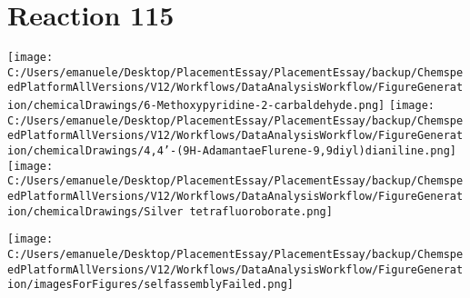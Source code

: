\documentclass{article}%
\begin{document}
\section*{Reaction 115}%
%
\begin{scheme}[H]%
\begin{minipage}{0.5\textwidth}%
\texttt{[image: C:/Users/emanuele/Desktop/PlacementEssay/PlacementEssay/backup/ChemspeedPlatformAllVersions/V12/Workflows/DataAnalysisWorkflow/FigureGeneration/chemicalDrawings/6-Methoxypyridine-2-carbaldehyde.png]}%
\texttt{[image: C:/Users/emanuele/Desktop/PlacementEssay/PlacementEssay/backup/ChemspeedPlatformAllVersions/V12/Workflows/DataAnalysisWorkflow/FigureGeneration/chemicalDrawings/4,4'-(9H-AdamantaeFlurene-9,9diyl)dianiline.png]}%
\texttt{[image: C:/Users/emanuele/Desktop/PlacementEssay/PlacementEssay/backup/ChemspeedPlatformAllVersions/V12/Workflows/DataAnalysisWorkflow/FigureGeneration/chemicalDrawings/Silver tetrafluoroborate.png]}%
\end{minipage}%
\begin{minipage}{0.5\textwidth}%
\begin{center}%
\texttt{[image: C:/Users/emanuele/Desktop/PlacementEssay/PlacementEssay/backup/ChemspeedPlatformAllVersions/V12/Workflows/DataAnalysisWorkflow/FigureGeneration/imagesForFigures/selfassemblyFailed.png]}%
\end{center}%
\end{minipage}%
\caption{Self-assembly of components 6, 13, with Silver(I) in a 3.0:1.5:1.0 molar ratio in CH$_3$CN at 60\textdegree C for 40h. These are the reagents (starting materials) for reaction 115.}%
\end{scheme}%
\end{document}
